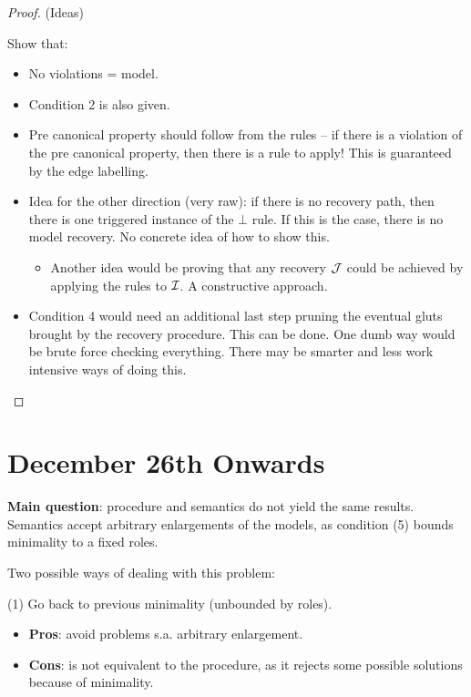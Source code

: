 \documentclass[draft]{article}
\begin{document}
\begin{proof} (Ideas)

  Show that: 

  \begin{itemize}
    \item No violations = model.
    \item Condition 2 is also given.
    \item Pre canonical property should follow from the rules -- if there is a violation of the pre canonical property, then there is a rule to apply! This is guaranteed by the edge labelling.
    \item Idea for the other direction (very raw): if there is no recovery path, then there is one triggered instance of the $\bot$ rule. If this is the case, there is no model recovery. No concrete idea of how to show this.
    \begin{itemize}
      \item Another idea would be proving that any recovery $\mathcal{J}$ could be achieved by applying the rules to $\mathcal{I}$. A constructive approach.
    \end{itemize}
    \item Condition 4 would need an additional last step pruning the eventual gluts brought by the recovery procedure. This can be done. One dumb way would be brute force checking everything. There may be smarter and less work intensive ways of doing this.
  \end{itemize}
  
\end{proof}


\section{December 26th Onwards}

\textbf{Main question}: procedure and semantics do not yield the same results. Semantics accept arbitrary enlargements of the models, as condition (5) bounds minimality to a fixed roles. 

Two possible ways of dealing with this problem:

(1) Go back to previous minimality (unbounded by roles).

\begin{itemize}
  \item \textbf{Pros}: avoid problems s.a. arbitrary enlargement. 
  \item \textbf{Cons}: is not equivalent to the procedure, as it rejects some possible solutions because of minimality.
\end{itemize}
\end{document}
